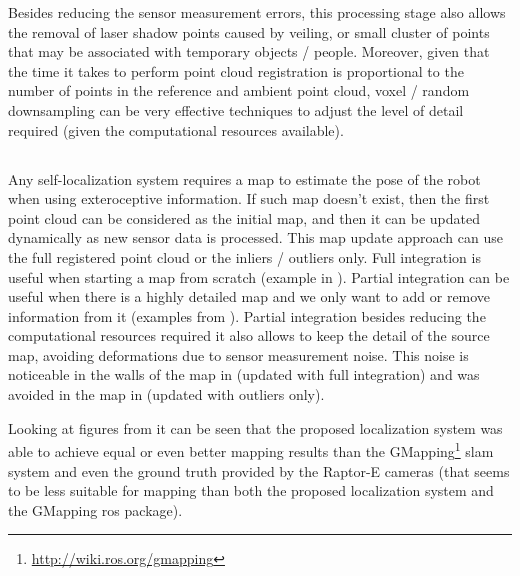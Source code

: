 Besides reducing the sensor measurement errors, this processing stage also allows the removal of laser shadow points caused by veiling, or small cluster of points that may be associated with temporary objects / people. Moreover, given that the time it takes to perform point cloud registration is proportional to the number of points in the reference and ambient point cloud, voxel / random downsampling can be very effective techniques to adjust the level of detail required (given the computational resources available).



\subsection{}

Any self-localization system requires a map to estimate the pose of the robot when using exteroceptive information. If such map doesn't exist, then the first point cloud can be considered as the initial map, and then it can be updated dynamically as new sensor data is processed. This map update approach can use the full registered point cloud or the inliers / outliers only. Full integration is useful when starting a map from scratch (example in ). Partial integration can be useful when there is a highly detailed map and we only want to add or remove information from it (examples from ). Partial integration besides reducing the computational resources required it also allows to keep the detail of the source map, avoiding deformations due to sensor measurement noise. This noise is noticeable in the walls of the map in  (updated with full integration) and was avoided in the map in  (updated with outliers only).

Looking at figures from  it can be seen that the proposed localization system was able to achieve equal or even better mapping results than the GMapping\footnote{\url{http://wiki.ros.org/gmapping}} \gls{slam} system and even the ground truth provided by the Raptor-E cameras (that seems to be less suitable for mapping than both the proposed localization system and the GMapping \gls{ros} package).


